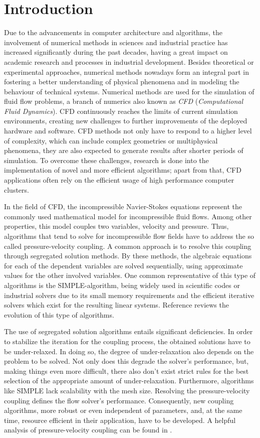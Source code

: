\section{Introduction}

Due to the advancements in computer architecture and algorithms, the involvement of numerical methods in sciences and industrial practice has increased significantly during the past decades, having a great impact on academic research and processes in industrial development. Besides theoretical or experimental approaches, numerical methods nowadays form an integral part in fostering a better understanding of physical phenomena and in modeling the behaviour of technical systems. Numerical methods are used for the simulation of fluid flow problems, a branch of numerics also known as \emph{CFD} (\emph{Computational Fluid Dynamics}). CFD continuously reaches the limits of current simulation environments, creating new challenges to further improvements of the deployed hardware and software. CFD methods not only have to respond to a higher level of complexity, which can include complex geometries or multiphysical phenomena, they are also expected to generate results after shorter periods of simulation. To overcome these challenges, research is done into the implementation of novel and more efficient algorithms; apart from that, CFD applications often rely on the efficient usage of high performance computer clusters. 

In the field of CFD, the incompressible Navier-Stokes equations represent the commonly used mathematical model for incompressible fluid flows. Among other properties, this model couples two variables, velocity and pressure. Thus, algorithms that tend to solve for incompressible flow fields have to address the so called pressure-velocity coupling. A common approach is to resolve this coupling through segregated solution methods. By these methods, the algebraic equations for each of the dependent variables are solved sequentially, using approximate values for the other involved variables. One common representative of this type of algorithms is the SIMPLE-algorithm, being widely used in scientific codes or industrial solvers due to its small memory requirements and the efficient iterative solvers which exist for the resulting linear systems. Reference \cite{acharya07} reviews the evolution of this type of algorithms.

The use of segregated solution algorithms entails significant deficiencies. In order to stabilize the iteration for the coupling process, the obtained solutions have to be under-relaxed. In doing so, the degree of under-relaxation also depends on the problem to be solved. Not only does this degrade the solver's performance, but, making things even more difficult, there also don't exist strict rules for the best selection of the appropriate amount of under-relaxation. Furthermore, algorithms like SIMPLE lack scalability with the mesh size. Resolving the pressure-velocity coupling defines the flow solver's performance. Consequently, new coupling algorithms, more robust or even independent of parameters, and, at the same time, resource efficient in their application, have to be developed. A helpful analysis of pressure-velocity coupling can be found in \cite{peric90}.

